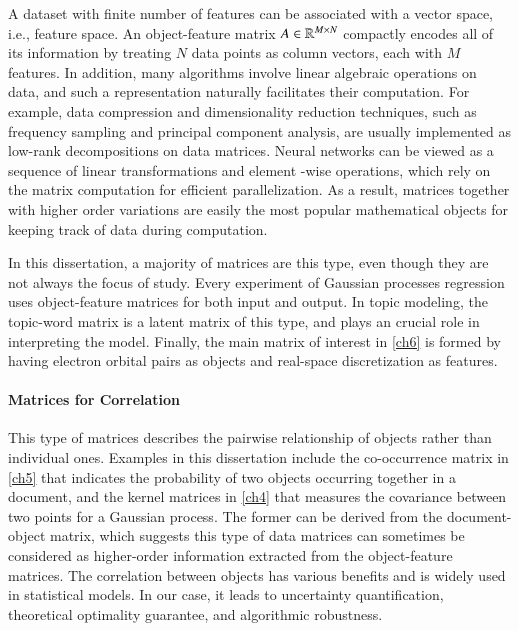 A dataset with finite number of features can be associated with a vector space,
i.e., feature space. An object\hyp{}feature matrix $A\in\mathbb{R}^{M\mathbin{\times} N}$
compactly encodes all of its information by treating $N$ data points as column
vectors, each with $M$ features. In addition, many algorithms involve linear
algebraic operations on data, and such a representation naturally facilitates
their computation. For example, data compression and dimensionality reduction
techniques, such as frequency sampling and principal component analysis, are
usually implemented as low\hyp{}rank decompositions on data matrices. Neural
networks can be viewed as a sequence of linear transformations and element
\hyp{}wise operations, which rely on the matrix computation for efficient
parallelization. As a result, matrices together with higher order variations are
easily the most popular mathematical objects for keeping track of data during
computation.

In this dissertation, a majority of matrices are this type, even though they are
not always the focus of study. Every experiment of Gaussian processes regression
uses object\hyp{}feature matrices for both input and output. In topic modeling,
the topic\hyp{}word matrix is a latent matrix of this type, and plays an crucial
role in interpreting the model. Finally, the main matrix of interest in 
\cref{ch6} is formed by having electron orbital pairs as objects and 
real\hyp{}space discretization as features.

\paragraph{Matrices for Correlation}

This type of matrices describes the pairwise relationship of objects rather
than individual ones. Examples in this dissertation include the 
co\hyp{}occurrence matrix in \cref{ch5} that indicates the probability of two
objects occurring together in a document, and the kernel matrices in \cref{ch4}
that measures the covariance between two points for a Gaussian process. The
former can be derived from the document\hyp{}object matrix, which suggests this
type of data matrices can sometimes be considered as higher\hyp{}order
information extracted from the object\hyp{}feature matrices. The correlation
between objects has various benefits and is widely used in statistical models.
In our case, it leads to uncertainty quantification, theoretical optimality
guarantee, and algorithmic robustness.

